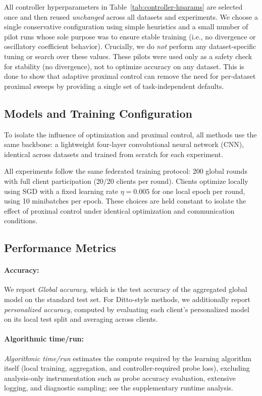 \documentclass[letterpaper]{article} %
\begin{document}
All controller hyperparameters in Table~\ref{tab:controller-hparams}
are selected once and then reused \emph{unchanged} across all datasets
and experiments. We choose a single conservative configuration using
simple heuristics and a small number of pilot runs whose sole purpose
was to ensure stable training (i.e., no divergence or oscillatory
coefficient behavior). Crucially, we do \emph{not} perform any
dataset-specific tuning or search over these values.
These pilots were used only as a safety check for stability (no
divergence), not to optimize accuracy on any dataset.
This is done to show that adaptive proximal control can remove the
need for per-dataset proximal sweeps by providing a single set of
task-independent defaults.



\subsection{Models and Training Configuration}

To isolate the influence of optimization and proximal control, all
methods use the same backbone: a lightweight four-layer convolutional
neural network (CNN), identical across datasets and trained from
scratch for each experiment.

All experiments follow the same federated training protocol: 200
global rounds with full client participation (20/20 clients per
round). Clients optimize locally using SGD with a fixed learning rate
$\eta = 0.005$ for one local epoch per round, using 10 minibatches
per epoch. These choices are held constant to isolate the effect of
proximal control under identical optimization and communication
conditions.
\subsection{Performance Metrics}

\paragraph{\textbf{Accuracy}:} We report \textit{Global accuracy}, which is the test accuracy of the aggregated global model on the standard test set. For Ditto-style methods, we additionally report \textit{personalized accuracy}, computed by evaluating each client's personalized model on its local test split and averaging across clients.

\paragraph{\textbf{Algorithmic time/run}:} \textit{Algorithmic time/run} estimates the compute required by the learning algorithm itself (local training, aggregation, and controller-required probe loss), excluding analysis-only instrumentation such as probe accuracy evaluation, extensive logging, and diagnostic sampling; see the supplementary runtime analysis.
\end{document}
